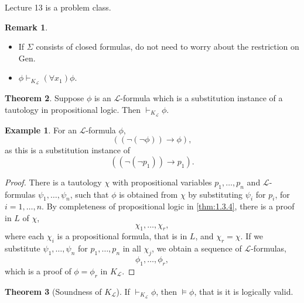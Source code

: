 \documentclass{article}
\renewcommand{\L}{\mathcal{L}}
\newcommand{\rb}[1]{\left( #1 \right)}
\newcommand{\notb}[1]{\rb{\neg #1}}
\newcommand{\impb}[2]{\rb{#1 \rightarrow #2}}
\newcommand{\fab}[1]{\rb{\forall #1}}
\theoremstyle{definition}\newtheorem{definition}{Definition}[subsection]
\theoremstyle{definition}\newtheorem{remark1}[definition]{Remark}
\theoremstyle{definition}\newtheorem{example1}[definition]{Example}
\theoremstyle{definition}\newtheorem*{remark2}{Remark}
\theoremstyle{definition}\newtheorem*{example2}{Example}
\theoremstyle{definition}\newtheorem*{note}{Note}
\theoremstyle{definition}\newtheorem*{notation}{Notation}
\newtheorem{theorem}[definition]{Theorem}
\begin{document}

Lecture 13 is a problem class.


\begin{remark1}
\hfill
\begin{itemize}
\item If $ \Sigma $ consists of closed formulas, do not need to worry about the restriction on Gen.
\item $ \phi \vdash_{K_{\L}} \fab{x_1}\phi $.
\end{itemize}
\end{remark1}

\begin{theorem}
\label{thm:2.4.4}
Suppose $ \phi $ is an $ \L $-formula which is a substitution instance of a tautology in propositional logic. Then $ \vdash_{K_{\L}} \phi $.
\end{theorem}

\begin{example2}
For an $ \L $-formula $ \phi $,
$$ \impb{\notb{\notb{\phi}}}{\phi}, $$
as this is a substitution instance of
$$ \impb{\notb{\notb{p_1}}}{p_1}. $$
\end{example2}

\begin{proof}
There is a tautology $ \chi $ with propositional variables $ p_1, \dots, p_n $ and $ \L $-formulas $ \psi_1, \dots, \psi_n $, such that $ \phi $ is obtained from $ \chi $ by substituting $ \psi_i $ for $ p_i $, for $ i = 1, \dots, n $. By completeness of propositional logic in \ref{thm:1.3.4}, there is a proof in $ L $ of $ \chi $,
$$ \chi_1, \dots, \chi_r, $$
where each $ \chi_i $ is a propositional formula, that is in $ L $, and $ \chi_r = \chi $. If we substitute $ \psi_1, \dots, \psi_n $ for $ p_1, \dots, p_n $ in all $ \chi_j $, we obtain a sequence of $ \L $-formulas,
$$ \phi_1, \dots, \phi_r, $$
which is a proof of $ \phi = \phi_r $ in $ K_{\L} $.
\end{proof}

\begin{theorem}[Soundness of $ K_{\L} $]
If $ \vdash_{K_{\L}} \phi $, then $ \vDash \phi $, that is it is logically valid.
\end{theorem}
\end{document}
